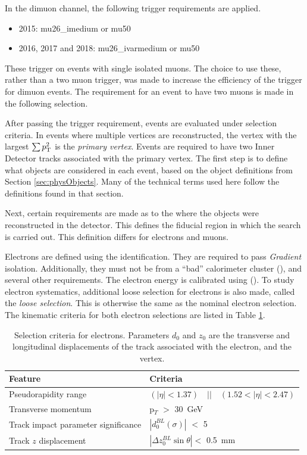 In the dimuon channel, the following trigger requirements are applied.
\begin{itemize}
	\item 2015: mu26\_imedium or mu50
	\item 2016, 2017 and 2018: mu26\_ivarmedium or mu50
\end{itemize}
These trigger on events with single isolated muons. 
The choice to use these, rather than a two muon trigger, was made to increase the efficiency of the trigger for dimuon events.
The requirement for an event to have two muons is made in the following selection.

After passing the trigger requirement, events are evaluated under selection criteria.
In events where multiple vertices are reconstructed, the vertex with the largest $\sum p_\text{T}^2$ is the \emph{primary vertex}.
Events are required to have two Inner Detector tracks associated with the primary vertex.
The first step is to define what objects are considered in each event, based on the object definitions from Section \ref{sec:physObjects}.
Many of the technical terms used here follow the definitions found in that section.

Next, certain requirements are made as to the where the objects were reconstructed in the detector. 
This defines the fiducial region in which the search is carried out.
This definition differs for electrons and muons.

Electrons are defined using the  identification.
They are required to pass \emph{Gradient} isolation.
Additionally, they must not be from a ``bad'' calorimeter cluster (), and several other requirements.
The electron energy is calibrated using  ().
To study electron systematics, additional loose selection for electrons is also made, called the \emph{loose selection}.
This is otherwise the same as the nominal electron selection.
The kinematic criteria for both electron selections are listed in Table \ref{tab:ciElectronSel}.

\begin{table}[!htb]
\caption{Selection criteria for electrons. Parameters $d_{0}$ and $z_{0}$ are the transverse and longitudinal displacements of the track associated with the electron, and the vertex.}
\begin{center}
    \begin{tabular}[ht]{l l}
    \toprule
    Feature & Criteria \\
    \midrule
    Pseudorapidity range & $(|\eta| < 1.37) \quad || \quad (1.52 < |\eta| < 2.47)$ \\
    Transverse momentum & p$_T$ $>$ 30~GeV \\
    Track impact parameter significance & $|d_{0}^{BL}(\sigma)|$ $<$ 5 \\
    Track $z$ displacement & $|\Delta z_{0}^{BL} \sin{\theta}| <$ 0.5~mm \\
    \bottomrule
    \end{tabular}
\end{center}
\label{tab:ciElectronSel}
\end{table}

